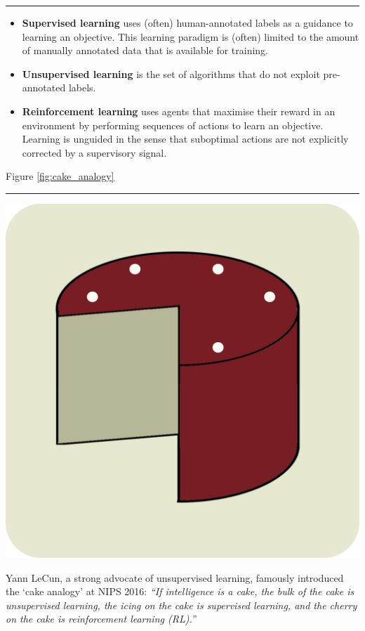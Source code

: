 
\noindent\rule{\textwidth}{0.5pt}

\begin{itemize}
    \item \textbf{Supervised learning} uses (often) human-annotated labels as a guidance to learning an objective. This learning paradigm is (often) limited to the amount of manually annotated data that is available for training.
    \item \textbf{Unsupervised learning} is the set of algorithms that do not exploit pre-annotated labels.
    \item \textbf{Reinforcement learning} uses agents that maximise their reward in an environment by performing sequences of actions to learn an objective. Learning is unguided in the sense that suboptimal actions are not explicitly corrected by a supervisory signal.
\end{itemize}
Figure \ref{fig:cake_analogy}

\noindent\rule{\textwidth}{0.5pt}

\begin{marginfigure}[{0cm}]
    \includegraphics[width=\textwidth]{figs/cake_analogy.pdf}
    \caption{Yann LeCun, a strong advocate of unsupervised learning, famously introduced the `cake analogy' at NIPS 2016: \textit{``If intelligence is a cake, the bulk of the cake is unsupervised learning, the icing on the cake is supervised learning, and the cherry on the cake is reinforcement learning (RL).''}}
    \label{fig:cake_analogy}
\end{marginfigure}



